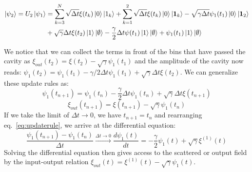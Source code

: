 \begin{equation}
\begin{aligned}
    \ket{\psi_2} = U_2 \ket{\psi_1} &= \sum_{k=3}^N \sqrt{\Delta t} \xi(t_k) \ket{0} \ket{1_k} + \sum_{k=1}^2 \sqrt{\Delta t} \xi(t_k) \ket{0} \ket{\mathbf{1}_k} - \sqrt{\gamma \Delta t} \psi_1(t_1) \ket{0}\ket{\mathbf{1}_2} \\
    & + \sqrt{\gamma}  \Delta t \xi(t_2) \ket{1}\ket{\emptyset} - \frac{\gamma}{2} \Delta t \psi(t_1) \ket{1}\ket{\emptyset} + \psi_1(t_1) \ket{1}\ket{\emptyset}
\end{aligned}
\end{equation}


We notice that we can collect the terms in front of the bins that have passed the cavity as $\xi_{out}(t_2) = \xi(t_2) - \sqrt{\gamma} \psi_1(t_1)$ and the amplitude of the cavity now reads: $\psi_1(t_2) = \psi_1(t_1) -\gamma/2 \Delta t \psi_1(t_1) + \sqrt{\gamma}\Delta t \xi(t_2)$. We can generalize these update rules as:
\begin{equation}
    \psi_1(t_{n+1}) = \psi_1(t_n) -\frac{\gamma}{2} \Delta t \psi_1(t_n) + \sqrt{\gamma}\Delta t \xi(t_{n+1}) \label{eq:updaterule} 
\end{equation}
\begin{equation}
    \xi_{out}(t_{n+1}) = \xi(t_{n+1}) - \sqrt{\gamma} \psi_1(t_{n}) 
\end{equation}
If we take the limit of $\Delta t \rightarrow 0$, we have $t_{n+1} = t_n$ and rearranging eq.~\ref{eq:updaterule}, we arrive at the differential equation:
\begin{equation}
    \frac{\psi_1(t_{n+1}) - \psi_1(t_n)}{\Delta t} \xrightarrow[]{\Delta t \rightarrow 0} \frac{d \psi_1(t)}{d t}  = -\frac{\gamma}{2} \psi_1(t) + \sqrt{\gamma} \xi^{(1)}(t)
\end{equation}
Solving the differential equation then gives access to the scattered or output field by the input-output relation $\xi_{out}(t) = \xi^{(1)}(t) - \sqrt{\gamma} \psi_1(t)$. 

